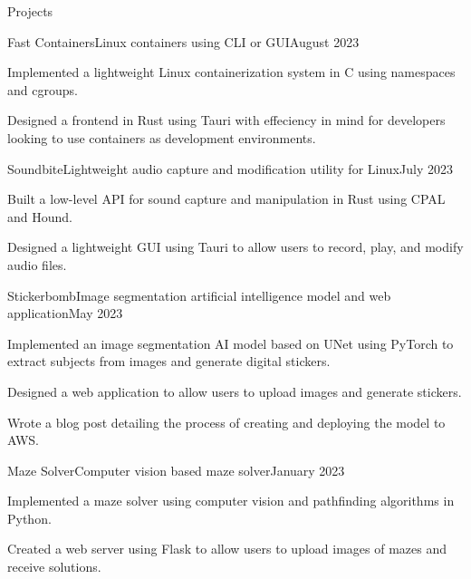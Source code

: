 \documentclass{article}
\newlength{\secsep}
\newenvironment{tabbedsection}[1]{
  \begin{list}{}{
      \setlength{\itemsep}{0pt}
      \setlength{\labelsep}{0pt}
      \setlength{\labelwidth}{0pt}
      \setlength{\leftmargin}{0pt}
      \setlength{\rightmargin}{0pt}
      \setlength{\listparindent}{0pt}
      \setlength{\parsep}{0pt}
      \setlength{\parskip}{0pt}
      \setlength{\partopsep}{0pt}
      \setlength{\topsep}{#1}
    }
  \item[]
}{\end{list}}
\newenvironment{resume_section}[1]{
  \filbreak
  \vspace{\secsep}
  {\color {MyDarkBlue}\textbf {\underline{#1}}}
  \begin{tabbedsection}{\secsep}
}{\end{tabbedsection}}
\newenvironment{subitems}{
  \renewcommand{\labelitemi}{-}
  \begin{itemize}
      \setlength{\labelsep}{1em}
}{\end{itemize}}
\newenvironment{resume_employer}[4]{
  \vspace{\secsep}
  \textbf{#1} \\ 
  \textnormal{#2} \hfill {#3 (#4)}{\parfillskip=0pt\par}
  \begin{tabbedsection}{0pt}
  \begin{subitems}
}{\end{subitems}\end{tabbedsection}}
\begin{document}
\begin{resume_section}{Projects}
  \begin{resume_employer}{Fast Containers}{Linux containers using CLI or GUI}{}{August 2023}
    \item Implemented a lightweight Linux containerization system in C using namespaces and cgroups.
    \item Designed a frontend in Rust using Tauri with effeciency in mind for developers looking to use containers as development environments.
  \end{resume_employer}

  \begin{resume_employer}{Soundbite}{Lightweight audio capture and modification utility for Linux}{}{July 2023}
    \item Built a low-level API for sound capture and manipulation in Rust using CPAL and Hound.
    \item Designed a lightweight GUI using Tauri to allow users to record, play, and modify audio files.
  \end{resume_employer}

  \begin{resume_employer}{Stickerbomb}{Image segmentation artificial intelligence model and web application}{}{May 2023}
    \item Implemented an image segmentation AI model based on UNet using PyTorch to extract subjects from images and generate digital stickers.
    \item Designed a web application to allow users to upload images and generate stickers.
    \item Wrote a blog post detailing the process of creating and deploying the model to AWS.
  \end{resume_employer}

  \begin{resume_employer}{Maze Solver}{Computer vision based maze solver}{}{January 2023}
    \item Implemented a maze solver using computer vision and pathfinding algorithms in Python.
    \item Created a web server using Flask to allow users to upload images of mazes and receive solutions.
  \end{resume_employer}
\end{resume_section}
\end{document}
